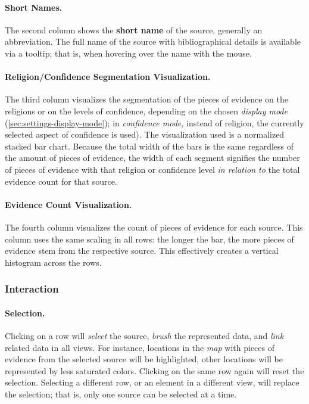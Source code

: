 \paragraph{Short Names.}
The second column shows the \textbf{short name} of the source, generally an abbreviation.
The full name of the source with bibliographical details is available via a tooltip;
that is, when hovering over the name with the mouse.


\paragraph{Religion/Confidence Segmentation Visualization.}
The third column visualizes the segmentation of the pieces of evidence on the religions or on the levels of confidence, depending on the chosen \emph{display mode} (\cref{sec:settings-display-mode});
in \emph{confidence mode,} instead of religion, the currently selected aspect of confidence is used).
The visualization used is a normalized stacked bar chart.
Because the total width of the bars is the same regardless of the amount of pieces of evidence, the width of each segment signifies the number of pieces of evidence with that religion or confidence level \emph{in relation to} the total evidence count for that source.


\paragraph{Evidence Count Visualization.}
The fourth column visualizes the count of pieces of evidence for each source.
This column uses the same scaling in all rows:
the longer the bar, the more pieces of evidence stem from the respective source.
This effectively creates a vertical histogram across the rows.

\subsubsection{Interaction}

\paragraph{Selection.}
Clicking on a row will \emph{select} the source, \emph{brush} the represented data, and \emph{link} related data in all views.
For instance, locations in the \emph{map} with pieces of evidence from the selected source will be highlighted, other locations will be represented by less saturated colors.
Clicking on the same row again will reset the selection.
Selecting a different row, or an element in a different view, will replace the selection;
that is, only one source can be selected at a time.

